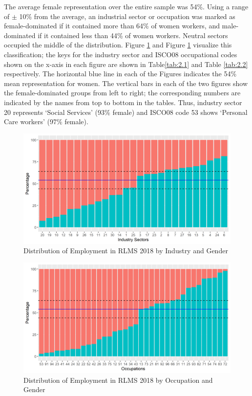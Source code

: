 \documentclass[alpha-refs]{wiley-article-02b}
\begin{document}
The average female representation over the entire sample was 54\%.  Using a 
range of $\pm$ 10\% from the average, an industrial sector or occupation 
was marked as female-dominated if it contained more than  64\% of women 
workers, and male-dominated if it contained less than 44\% of 
women workers. Neutral sectors occupied the middle of the distribution.
Figure \ref{fig:2.1} and Figure \ref{fig:2.1} visualize this 
classification; the keys for the industry sector and ISCO08 occupational 
codes shown on the x-axis in each figure are shown in Table\ref{tab:2.1} 
and Table \ref{tab:2.2} respectively. The horizontal blue line in each of 
the Figures indicates the 54\% mean representation for women. The vertical 
bars in each of the two figures show the female-dominated groups from left 
to right; the corresponding numbers are indicated by the names from top to 
bottom in the tables. Thus, industry sector 20 represents `Social Services' 
(93\% female) and ISCO08 code 53 shows `Personal Care workers' (97\% 
female).

\begin{figure}[htbp!]
	\centering
	\includegraphics[width=400pt]{gen_ind18.png}
	\caption{Distribution of Employment in RLMS 2018 by Industry and Gender}\label{fig:2.1}
\end{figure}

\begin{figure}[htbp!]
	\centering
	\includegraphics[width=400pt]{gen_occ18.png}
	\caption{Distribution of Employment in RLMS 2018 by Occupation and Gender}\label{fig:2.2}
\end{figure}
	
\end{document}
